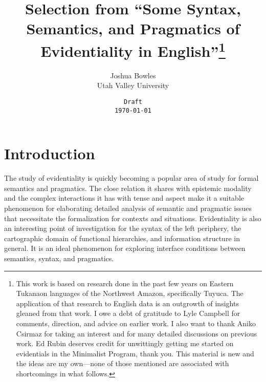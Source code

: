 \documentclass[11pt]{article}
\begin{document}
\title{Selection from ``Some Syntax, Semantics, and Pragmatics of Evidentiality
in English''\footnote{This work is based on research done in the past few years
on Eastern Tukanaon languages of the Northwest Amazon, specifically Tuyuca. The
application of that research to English data is an outgrowth of insights gleaned
from that work. I owe a debt of gratitude to Lyle Campbell for comments,
direction, and advice on earlier work. I also want to thank Aniko Csirmaz for
taking an interest and for many detailed discussions on previous work. Ed Rubin
deserves credit for unwittingly getting me started on evidentials in the
Minimalist Program, thank you. This material is new and the ideas are my own---none of those mentioned are associated with shortcomings in what follows.}}

\author{Joshua Bowles\\
Utah Valley University}
\date{{\tt Draft\\ \today}}
\maketitle


\section{Introduction}
The study of evidentiality is quickly becoming a popular area of study for formal semantics and pragmatics. The close relation it shares with epistemic modality and the complex interactions it has with tense and aspect make it a suitable phenomenon for elaborating detailed analysis of semantic and pragmatic issues that necessitate the formalization for contexts and situations. Evidentiality is also an interesting point of investigation for the syntax of the left periphery, the cartographic domain of functional hierarchies, and information structure in general. It is an ideal phenomenon for exploring interface conditions between semantics, syntax, and pragmatics.
\end{document}
